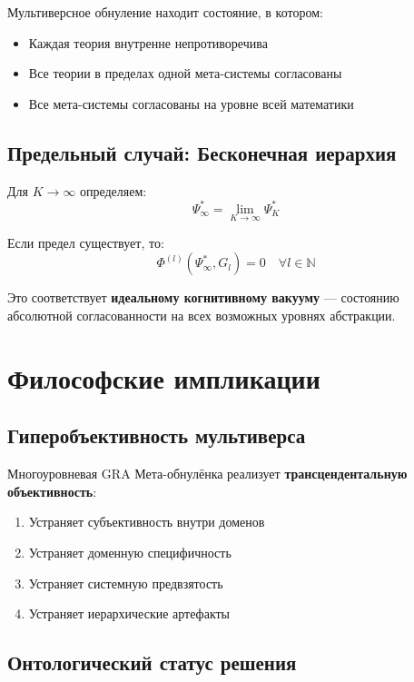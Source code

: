 \documentclass[12pt,a4paper]{article}
\newcommand{\PhiFunc}{\Phi}
\begin{document}
Мультиверсное обнуление находит состояние, в котором:
\begin{itemize}
    \item Каждая теория внутренне непротиворечива
    \item Все теории в пределах одной мета-системы согласованы
    \item Все мета-системы согласованы на уровне всей математики
\end{itemize}

\subsection{Предельный случай: Бесконечная иерархия}

Для $K \to \infty$ определяем:
\begin{equation}
\Psi_{\infty}^* = \lim_{K \to \infty} \Psi_K^*
\end{equation}

Если предел существует, то:
\begin{equation}
\PhiFunc^{(l)}(\Psi_{\infty}^*, G_l) = 0 \quad \forall l \in \mathbb{N}
\end{equation}

Это соответствует \textbf{идеальному когнитивному вакууму} --- состоянию абсолютной согласованности на всех возможных уровнях абстракции.

\section{Философские импликации}

\subsection{Гиперобъективность мультиверса}

Многоуровневая GRA Мета-обнулёнка реализует \textbf{трансцендентальную объективность}:
\begin{enumerate}
    \item Устраняет субъективность внутри доменов
    \item Устраняет доменную специфичность
    \item Устраняет системную предвзятость
    \item Устраняет иерархические артефакты
\end{enumerate}

\subsection{Онтологический статус решения}
\end{document}
